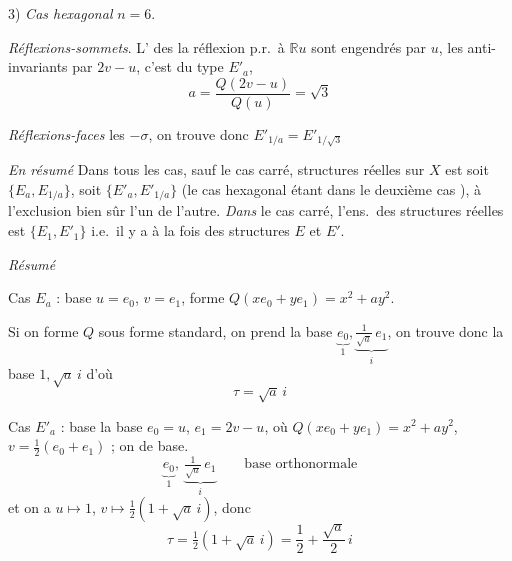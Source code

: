 \documentclass[11pt,a4paper]{article}
\begin{document}
3) \emph{Cas hexagonal} $n = 6$.

\struck{\ill{}} \emph{Réflexions-sommets}. L' des
  la réflexion p.r.\ à $\mathbb{R} u$ sont
engendrés par $u$, les anti-invariants par $2v - u$, c'est du type $E'_{a}$,
\[
  a = \frac{Q(2v - u)}{Q(u)} = \sqrt{3}
\]

\emph{Réflexions-faces}  les $-\sigma$, on trouve donc
$E'_{1/a} = E'_{1/\sqrt{3}}$

\emph{En résumé} Dans tous les cas, sauf le cas carré, \struck{\ill{}}
  structures réelles sur $X$ est soit
 $\{E_{a}, E_{1/a}\}$,   soit
$\{E'_{a}, E'_{1/a}\}$ (le cas hexagonal étant dans le deuxième cas ), à l'exclusion bien sûr l'un de l'autre.
\emph{Dans} le cas carré, l'ens.\ des structures réelles est
$\{E_{1}, E'_{1}\}$ i.e.\ il y a à la fois des structures $E$ et $E'$.

\emph{Résumé}

Cas $E_{a}$ : base $u = e_{0}$, $v = e_{1}$, forme
 $Q(x e_{0} + y e_{1}) = x^{2} + a y^{2}$.

Si on  \struck{\ill{}}  forme $Q$
sous forme standard, on prend la base
$\underbrace{e_{0}}_{1}, \underbrace{\tfrac{1}{\sqrt{a}}\, e_{1}}_{i}$, on
trouve donc la base $1, \sqrt{a}\, i$ d'où
\[
  \boxed{\tau = \sqrt{a}\, i}
\]

Cas $E'_{a}$ : base  \ill{} \ill{}
\ill{} \ill{} la base $e_{0} = u$, $e_{1} = 2v - u$, où
$Q(x e_{0} + y e_{1}) = x^{2} + a y^{2}$, $v = \tfrac{1}{2}(e_{0} + e_{1})$ ;
on \struck{\ill{}}   de base.
\[
  \underbrace{e_{0}}_{1}, \ \underbrace{\tfrac{1}{\sqrt{a}}\, e_{1}}_{i}
  \qquad \text{base orthonormale}
\]
et on a $u \mapsto 1$, $v \mapsto \tfrac{1}{2}(1 + \sqrt{a}\, i)$, donc
\[
  \boxed{\tau = \tfrac{1}{2}(1 + \sqrt{a}\, i)} = \frac{1}{2} + \frac{\sqrt{a}}{2}\, i
\]
\end{document}
